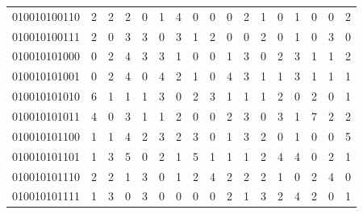 \documentclass[10pt,a4paper]{article}
\begin{document}
\begin{longtable}{ |c|c|c|c|c|c|c|c|c|c|c|c|c|c|c|c|c| }
    010010100110              & 2                            & 2                                & 2                            & 0                              & 1   & 4   & 0   & 0   & 0   & 2   & 1   & 0   & 1   & 0   & 0   & 2   \\
    010010100111              & 2                            & 0                                & 3                            & 3                              & 0   & 3   & 1   & 2   & 0   & 0   & 2   & 0   & 1   & 0   & 3   & 0   \\
    010010101000              & 0                            & 2                                & 4                            & 3                              & 3   & 1   & 0   & 0   & 1   & 3   & 0   & 2   & 3   & 1   & 1   & 2   \\
    010010101001              & 0                            & 2                                & 4                            & 0                              & 4   & 2   & 1   & 0   & 4   & 3   & 1   & 1   & 3   & 1   & 1   & 1   \\
    010010101010              & 6                            & 1                                & 1                            & 1                              & 3   & 0   & 2   & 3   & 1   & 1   & 1   & 2   & 0   & 2   & 0   & 1   \\
    010010101011              & 4                            & 0                                & 3                            & 1                              & 1   & 2   & 0   & 0   & 2   & 3   & 0   & 3   & 1   & 7   & 2   & 2   \\
    010010101100              & 1                            & 1                                & 4                            & 2                              & 3   & 2   & 3   & 0   & 1   & 3   & 2   & 0   & 1   & 0   & 0   & 5   \\
    010010101101              & 1                            & 3                                & 5                            & 0                              & 2   & 1   & 5   & 1   & 1   & 1   & 2   & 4   & 4   & 0   & 2   & 1   \\
    010010101110              & 2                            & 2                                & 1                            & 3                              & 0   & 1   & 2   & 4   & 2   & 2   & 2   & 1   & 0   & 2   & 4   & 0   \\
    010010101111              & 1                            & 3                                & 0                            & 3                              & 0   & 0   & 0   & 0   & 2   & 1   & 3   & 2   & 4   & 2   & 0   & 1   \\

\end{longtable}
\end{document}
